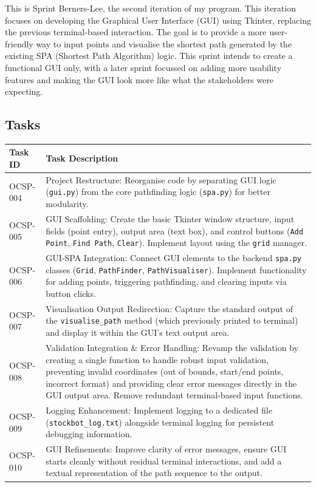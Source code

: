This is Sprint Berners-Lee, the second iteration of my program. This iteration focuses on developing the Graphical User Interface (GUI) using Tkinter, replacing the previous terminal-based interaction. The goal is to provide a more user-friendly way to input points and visualise the shortest path generated by the existing SPA (Shortest Path Algorithm) logic. This sprint intends to create a functional GUI only, with a later sprint focussed on adding more usability features and making the GUI look more like what the stakeholders were expecting.

\subsection{Tasks}

\begin{table}[htbp]
	\centering
	\begin{tabularx}{\textwidth}{|l|X|}
		\hline
		\textbf{Task ID} & \textbf{Task Description} \\
		\hline
		OCSP-004 & Project Restructure: Reorganise code by separating GUI logic (\verb|gui.py|) from the core pathfinding logic (\verb|spa.py|) for better modularity. \\
		\hline
		OCSP-005 & GUI Scaffolding: Create the basic Tkinter window structure, input fields (point entry), output area (text box), and control buttons (\verb|Add Point|, \verb|Find Path|, \verb|Clear|). Implement layout using the \verb|grid| manager. \\
		\hline
		OCSP-006 & GUI-SPA Integration: Connect GUI elements to the backend \verb|spa.py| classes (\verb|Grid|, \verb|PathFinder|, \verb|PathVisualiser|). Implement functionality for adding points, triggering pathfinding, and clearing inputs via button clicks. \\
		\hline
		OCSP-007 & Visualisation Output Redirection: Capture the standard output of the \verb|visualise_path| method (which previously printed to terminal) and display it within the GUI's text output area. \\
		\hline
		OCSP-008 & Validation Integration \& Error Handling: Revamp the validation by creating a single function to handle robust input validation, preventing invalid coordinates (out of bounds, start/end points, incorrect format) and providing clear error messages directly in the GUI output area. Remove redundant terminal-based input functions. \\
		\hline
		OCSP-009 & Logging Enhancement: Implement logging to a dedicated file (\verb|stockbot_log.txt|) alongside terminal logging for persistent debugging information. \\
		\hline
		OCSP-010 & GUI Refinements: Improve clarity of error messages, ensure GUI starts cleanly without residual terminal interactions, and add a textual representation of the path sequence to the output. \\
		\hline
	\end{tabularx}
\end{table}

